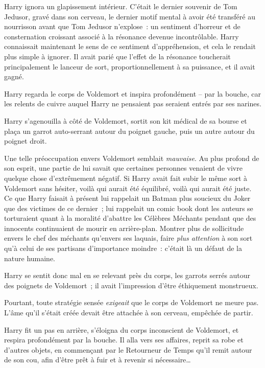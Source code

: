 Harry ignora un glapissement intérieur. C'était le dernier souvenir de Tom Jedusor, gravé dans son cerveau, le dernier motif mental à avoir été transféré au nourrisson avant que Tom Jedusor n'explose~: un sentiment d'horreur et de consternation croissant associé à la résonance devenue incontrôlable. Harry connaissait maintenant le sens de ce sentiment d'appréhension, et cela le rendait plus simple à ignorer. Il avait parié que l'effet de la résonance toucherait principalement le lanceur de sort, proportionnellement à sa puissance, et il avait gagné.

Harry regarda le corps de Voldemort et inspira profondément -- par la bouche, car les relents de cuivre auquel Harry ne pensaient pas seraient entrés par ses narines.

Harry s'agenouilla à côté de Voldemort, sortit son kit médical de sa bourse et plaça un garrot auto-serrant autour du poignet gauche, puis un autre autour du poignet droit.

Une telle préoccupation envers Voldemort semblait \emph{mauvaise}. Au plus profond de son esprit, une partie de lui savait que certaines personnes venaient de vivre quelque chose d'extrêmement négatif. Si Harry avait fait subir le même sort à Voldemort sans hésiter, voilà qui aurait été équilibré, voilà qui aurait été juste. Ce que Harry faisait à présent lui rappelait un Batman plus soucieux du Joker que des victimes de ce dernier~; lui rappelait un comic book dont les auteurs se torturaient quant à la moralité d'abattre les Célèbres Méchants pendant que des innocents continuaient de mourir en arrière-plan. Montrer plus de sollicitude envers le chef des méchants qu'envers ses laquais, faire \emph{plus attention} à son sort qu'à celui de ses partisans d'importance moindre~: c'était là un défaut de la nature humaine.

Harry se sentit donc mal en se relevant près du corps, les garrots serrés autour des poignets de Voldemort~; il avait l'impression d'être éthiquement monstrueux.

Pourtant, toute stratégie sensée \emph{exigeait} que le corps de Voldemort ne meure pas. L'âme qu'il s'était créée devait être attachée à son cerveau, empêchée de partir.

Harry fit un pas en arrière, s'éloigna du corps inconscient de Voldemort, et respira profondément par la bouche. Il alla vers ses affaires, reprit sa robe et d'autres objets, en commençant par le Retourneur de Temps qu'il remit autour de son cou, afin d'être prêt à fuir et à revenir si nécessaire…

